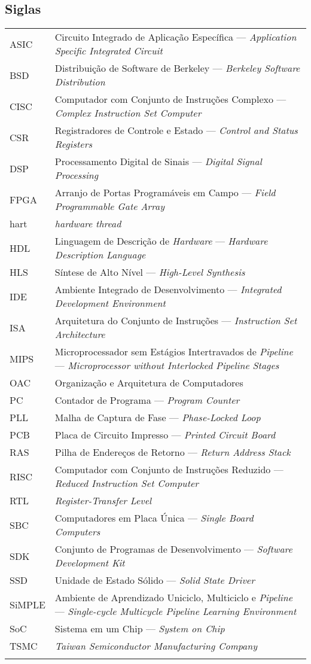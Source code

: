 \subsection*{Siglas}

\begin{tabular}{p{}p{}}
    {ASIC}      & {Circuito Integrado de Aplicação Específica --- \textit{Application Specific Integrated Circuit}}\tabularnewline{}
    {BSD}       & {Distribuição de Software de Berkeley --- \textit{Berkeley Software Distribution}}\tabularnewline{}
    {CISC}      & {Computador com Conjunto de Instruções Complexo --- \textit{Complex Instruction Set Computer}} \tabularnewline{}
    {CSR}       & {Registradores de Controle e Estado --- \textit{Control and Status Registers}} \tabularnewline{}
    {DSP}       & {Processamento Digital de Sinais --- \textit{Digital Signal Processing}} \tabularnewline{}
    {FPGA}      & {Arranjo de Portas Programáveis em Campo --- \textit{Field Programmable Gate Array}} \tabularnewline{}
    {hart}      & {\textit{hardware thread}} \tabularnewline{}
    {HDL}       & {Linguagem de Descrição de \textit{Hardware} --- \textit{Hardware Description Language}} \tabularnewline{}
    {HLS}       & {Síntese de Alto Nível --- \textit{High-Level Synthesis}} \tabularnewline{}
    {IDE}       & {Ambiente Integrado de Desenvolvimento --- \textit{Integrated Development Environment}} \tabularnewline{}
    {ISA}       & {Arquitetura do Conjunto de Instruções --- \textit{Instruction Set Architecture}} \tabularnewline{}
    {MIPS}      & {Microprocessador sem Estágios Intertravados de \textit{Pipeline} --- \textit{Microprocessor without Interlocked Pipeline Stages}} \tabularnewline{}
    {OAC}       & {Organização e Arquitetura de Computadores} \tabularnewline{}
    {PC}        & {Contador de Programa --- \textit{Program Counter}} \tabularnewline{}
    {PLL}       & {Malha de Captura de Fase --- \textit{Phase-Locked Loop}} \tabularnewline{}
    {PCB}       & {Placa de Circuito Impresso --- \textit{Printed Circuit Board}} \tabularnewline{}
    {RAS}       & {Pilha de Endereços de Retorno --- \textit{Return Address Stack}} \tabularnewline{}
    {RISC}      & {Computador com Conjunto de Instruções Reduzido --- \textit{Reduced Instruction Set Computer}} \tabularnewline{}
    {RTL}       & {\textit{Register-Transfer Level}} \tabularnewline{}
    {SBC}       & {Computadores em Placa Única --- \textit{Single Board Computers}} \tabularnewline{}
    {SDK}       & {Conjunto de Programas de Desenvolvimento --- \textit{Software Development Kit}} \tabularnewline{}
    {SSD}       & {Unidade de Estado Sólido --- \textit{Solid State Driver}} \tabularnewline{}
    {SiMPLE}    & {Ambiente de Aprendizado Uniciclo, Multiciclo e \textit{Pipeline} --- \textit{Single-cycle Multicycle Pipeline Learning Environment}} \tabularnewline{}
    {SoC}       & {Sistema em um Chip --- \textit{System on Chip}} \tabularnewline{}
    {TSMC}      & {\textit{Taiwan Semiconductor Manufacturing Company}} \tabularnewline{}
\end{tabular}

